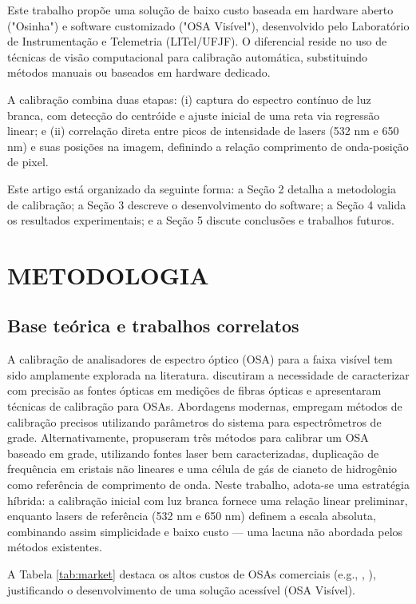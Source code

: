 \documentclass[a4paper]{ifacconf}
\begin{document}
Este trabalho propõe uma solução de baixo custo baseada em hardware aberto ("Osinha") e software customizado ("OSA Visível"), desenvolvido pelo Laboratório de Instrumentação e Telemetria (LITel/UFJF). O diferencial reside no uso de técnicas de visão computacional para calibração automática, substituindo métodos manuais ou baseados em hardware dedicado.

A calibração combina duas etapas: (i) captura do espectro contínuo de luz branca, com detecção do centróide e ajuste inicial de uma reta via regressão linear; e (ii) correlação direta entre picos de intensidade de lasers (532 nm e 650 nm) e suas posições na imagem, definindo a relação comprimento de onda-posição de pixel.

Este artigo está organizado da seguinte forma: a Seção 2 detalha a metodologia de calibração; a Seção 3 descreve o desenvolvimento do software; a Seção 4 valida os resultados experimentais; e a Seção 5 discute conclusões e trabalhos futuros.

\section{METODOLOGIA}
\label{sec:metodologia}

\subsection{Base teórica e trabalhos correlatos}
A calibração de analisadores de espectro óptico (OSA) para a faixa visível tem sido amplamente explorada na literatura. \cite{dubard1995} discutiram a necessidade de caracterizar com precisão as fontes ópticas em medições de fibras ópticas e apresentaram técnicas de calibração para OSAs. Abordagens modernas, \cite{liu2013} empregam métodos de calibração precisos utilizando parâmetros do sistema para espectrômetros de grade. Alternativamente, \cite{terra2015} propuseram três métodos para calibrar um OSA baseado em grade, utilizando fontes laser bem caracterizadas, duplicação de frequência em cristais não lineares e uma célula de gás de cianeto de hidrogênio como referência de comprimento de onda. Neste trabalho, adota-se uma estratégia híbrida: a calibração inicial com luz branca fornece uma relação linear preliminar, enquanto lasers de referência (532 nm e 650 nm) definem a escala absoluta, combinando assim simplicidade e baixo custo — uma lacuna não abordada pelos métodos existentes.

A Tabela \ref{tab:market} destaca os altos custos de OSAs comerciais (e.g., \cite{thorlabs_osa20xc}, \cite{anritsu_ms9740b}), justificando o desenvolvimento de uma solução acessível (OSA Visível).
\end{document}
